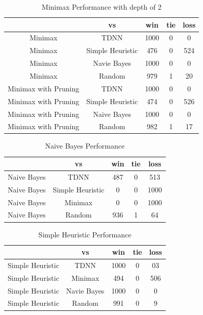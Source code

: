 \documentclass[12pt,letterpaper]{article}
\begin{document}
\begin{table}
\begin{center}
\begin{tabular}{|c||c|c|c|c|}
\hline
& vs & win & tie & loss\\
\hline \hline
Minimax & TDNN & 1000 & 0 & 0\\
\hline 
Minimax & Simple Heuristic & 476 & 0 & 524\\
\hline 
Minimax & Navie Bayes & 1000 & 0 & 0\\
\hline 
Minimax & Random & 979 & 1 & 20\\
\hline 
Minimax with Pruning & TDNN & 1000 & 0 & 0\\
\hline 
Minimax with Pruning & Simple Heuristic & 474 & 0 & 526\\
\hline 
Minimax with Pruning & Naive Bayes & 1000 & 0 & 0\\
\hline 
Minimax with Pruning & Random & 982 & 1 & 17\\
\hline 
\end{tabular}
\end{center}
\caption{Minimax Performance with depth of 2}
\label{MinimaxTable}
\end{table}


\begin{table}
\begin{center}
\begin{tabular}{|c||c|c|c|c|}
\hline
& vs & win & tie & loss\\
\hline \hline
Naive Bayes & TDNN & 487 & 0 & 513\\
\hline 
Naive Bayes & Simple Heuristic & 0 & 0 & 1000\\
\hline 
Naive Bayes & Minimax & 0 & 0 & 1000\\
\hline 
Naive Bayes & Random & 936 & 1 & 64\\
\hline 
\end{tabular}
\end{center}
\caption{Naive Bayes Performance}
\label{NaiveBayesTable}
\end{table}

\begin{table}
\begin{center}
\begin{tabular}{|c||c|c|c|c|}
\hline
& vs & win & tie & loss\\
\hline \hline
Simple Heuristic & TDNN & 1000 & 0 & 03\\
\hline 
Simple Heuristic & Minimax & 494 & 0 & 506\\
\hline 
Simple Heuristic & Navie Bayes & 1000 & 0 & 0\\
\hline 
Simple Heuristic & Random & 991 & 0 & 9\\
\hline 
\end{tabular}
\end{center}
\caption{Simple Heuristic Performance}
\label{HeuristicTable}
\end{table}
\end{document}
